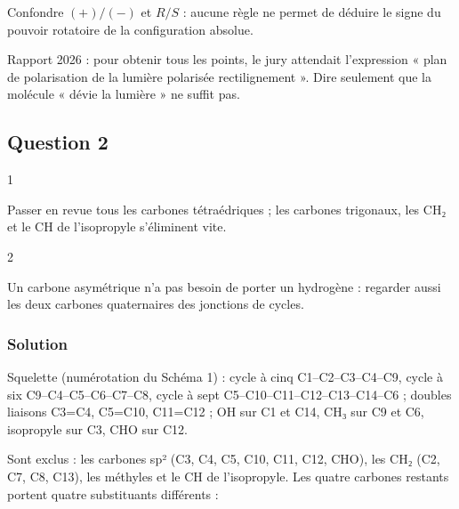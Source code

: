 \documentclass[11pt,a4paper]{article}
\begin{document}
\begin{piege}

Confondre \((+)/(-)\) et \(R/S\) : aucune règle ne permet de déduire le signe du pouvoir rotatoire de la configuration absolue.

\end{piege}

\begin{jury}

Rapport 2026 : pour obtenir tous les points, le jury attendait l'expression « plan de polarisation de la lumière polarisée rectilignement ». Dire seulement que la molécule « dévie la lumière » ne suffit pas.

\end{jury}

\hypertarget{question-2}{%
\subsection{Question 2}\label{question-2}}

\begin{indication}{1}

Passer en revue tous les carbones tétraédriques ; les carbones trigonaux, les CH₂ et le CH de l'isopropyle s'éliminent vite.

\end{indication}

\begin{indication}{2}

Un carbone asymétrique n'a pas besoin de porter un hydrogène : regarder aussi les deux carbones quaternaires des jonctions de cycles.

\end{indication}

\hypertarget{solution-1}{%
\subsubsection{Solution}\label{solution-1}}

Squelette (numérotation du Schéma 1) : cycle à cinq C1--C2--C3--C4--C9, cycle à six C9--C4--C5--C6--C7--C8, cycle à sept C5--\allowbreak{}C10--\allowbreak{}C11--\allowbreak{}C12--\allowbreak{}C13--\allowbreak{}C14--\allowbreak{}C6 ; doubles liaisons C3=C4, C5=C10, C11=C12 ; OH sur C1 et C14, CH₃ sur C9 et C6, isopropyle sur C3, CHO sur C12.

Sont exclus : les carbones sp² (C3, C4, C5, C10, C11, C12, CHO), les CH₂ (C2, C7, C8, C13), les méthyles et le CH de l'isopropyle. Les quatre carbones restants portent quatre substituants différents :
\end{document}
